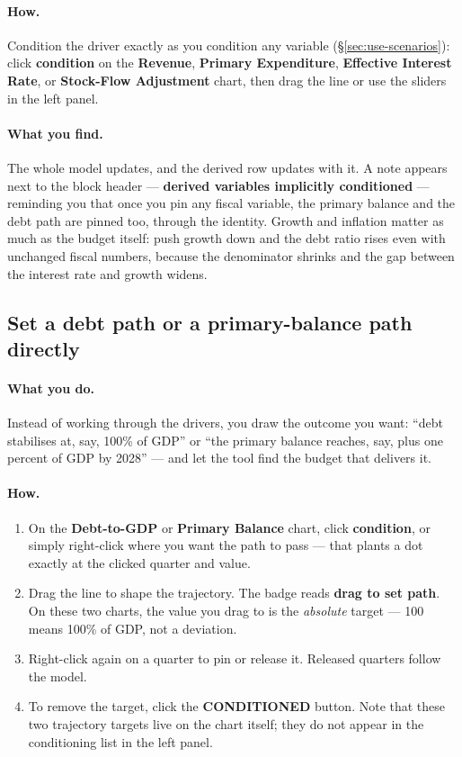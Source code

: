 \documentclass[11pt]{article}
\theoremstyle{definition}
\theoremstyle{remark}
\begin{document}
\paragraph{How.} Condition the driver exactly as you condition any variable
(\S\ref{sec:use-scenarios}): click \textbf{condition} on the \textbf{Revenue}, \textbf{Primary
Expenditure}, \textbf{Effective Interest Rate}, or \textbf{Stock-Flow Adjustment} chart, then
drag the line or use the sliders in the left panel.

\paragraph{What you find.} The whole model updates, and the derived row updates with it. A note
appears next to the block header --- \textbf{derived variables implicitly conditioned} ---
reminding you that once you pin any fiscal variable, the primary balance and the debt path are
pinned too, through the identity. Growth and inflation matter as much as the budget itself:
push growth down and the debt ratio rises even with unchanged fiscal numbers, because the
denominator shrinks and the gap between the interest rate and growth widens.

\subsection{Set a debt path or a primary-balance path directly}

\paragraph{What you do.} Instead of working through the drivers, you draw the outcome you want:
``debt stabilises at, say, 100\% of GDP'' or ``the primary balance reaches, say, plus one
percent of GDP by 2028'' --- and let the tool find the budget that delivers it.

\paragraph{How.}
\begin{enumerate}
  \item On the \textbf{Debt-to-GDP} or \textbf{Primary Balance} chart, click
    \textbf{condition}, or simply right-click where you want the path to pass --- that plants a
    dot exactly at the clicked quarter and value.
  \item Drag the line to shape the trajectory. The badge reads \textbf{drag to set path}. On
    these two charts, the value you drag to is the \emph{absolute} target --- 100 means 100\%
    of GDP, not a deviation.
  \item Right-click again on a quarter to pin or release it. Released quarters follow the model.
  \item To remove the target, click the \textbf{CONDITIONED} button. Note that these two
    trajectory targets live on the chart itself; they do not appear in the conditioning list
    in the left panel.
\end{enumerate}
\end{document}
